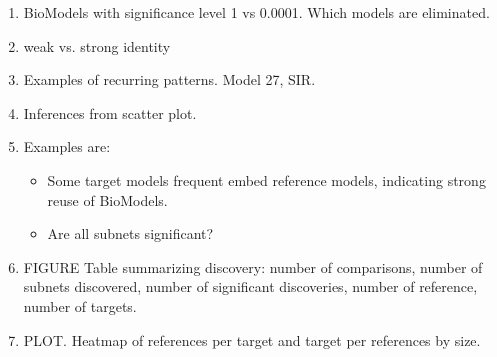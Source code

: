 \documentclass{article}
\begin{document}
\begin{enumerate}
    \item BioModels with significance level 1 vs 0.0001. Which models are eliminated.
    \item weak vs. strong identity
    \item Examples of recurring patterns. Model 27, SIR.
    \item Inferences from scatter plot.
     \item Examples are:
\begin{itemize}
    \item Some target models frequent embed reference models, indicating strong reuse of BioModels.
    \item Are all subnets significant? 
\end{itemize}

\item FIGURE Table summarizing discovery: number of comparisons, number of subnets discovered, number of significant discoveries, number of reference, number of targets.

\item PLOT. Heatmap of references per target and target per references by size.
\end{enumerate}



\end{document}
